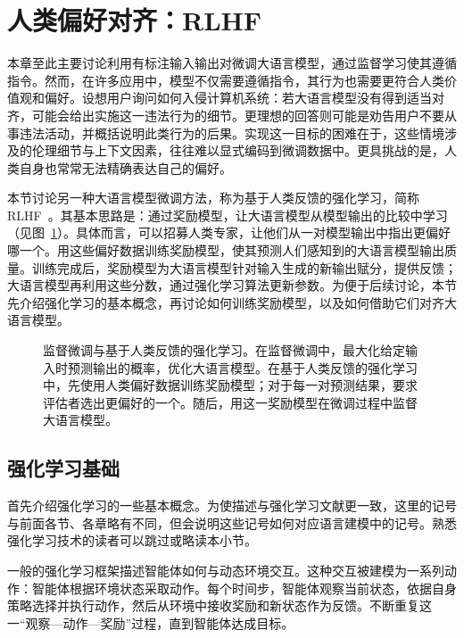 \section{人类偏好对齐：RLHF}
\label{sec:human-preference-alignment}

\noindent 本章至此主要讨论利用有标注输入输出对微调大语言模型，通过监督学习使其遵循指令。然而，在许多应用中，模型不仅需要遵循指令，其行为也需要更符合人类价值观和偏好。设想用户询问如何入侵计算机系统：若大语言模型没有得到适当对齐，可能会给出实施这一违法行为的细节。更理想的回答则可能是劝告用户不要从事违法活动，并概括说明此类行为的后果。实现这一目标的困难在于，这些情境涉及的伦理细节与上下文因素，往往难以显式编码到微调数据中。更具挑战的是，人类自身也常常无法精确表达自己的偏好。

本节讨论另一种大语言模型微调方法，称为基于人类反馈的强化学习，简称 RLHF~\cite{christiano-etal:2017deep,stiennon-etal:2020learning}。其基本思路是：通过奖励模型，让大语言模型从模型输出的比较中学习（见图~\ref{fig:sft-vs-rlhf}）。具体而言，可以招募人类专家，让他们从一对模型输出中指出更偏好哪一个。用这些偏好数据训练奖励模型，使其预测人们感知到的大语言模型输出质量。训练完成后，奖励模型为大语言模型针对输入生成的新输出赋分，提供反馈；大语言模型再利用这些分数，通过强化学习算法更新参数。为便于后续讨论，本节先介绍强化学习的基本概念，再讨论如何训练奖励模型，以及如何借助它们对齐大语言模型。

\begin{figure}[!t]
\centering

\caption{监督微调与基于人类反馈的强化学习。在监督微调中，最大化给定输入时预测输出的概率，优化大语言模型。在基于人类反馈的强化学习中，先使用人类偏好数据训练奖励模型；对于每一对预测结果，要求评估者选出更偏好的一个。随后，用这一奖励模型在微调过程中监督大语言模型。}
\label{fig:sft-vs-rlhf}
\end{figure}

\subsection{强化学习基础}
\label{sec:rl-basics}

\noindent 首先介绍强化学习的一些基本概念。为使描述与强化学习文献更一致，这里的记号与前面各节、各章略有不同，但会说明这些记号如何对应语言建模中的记号。熟悉强化学习技术的读者可以跳过或略读本小节。

一般的强化学习框架描述智能体如何与动态环境交互。这种交互被建模为一系列动作：智能体根据环境状态采取动作。每个时间步，智能体观察当前状态，依据自身策略选择并执行动作，然后从环境中接收奖励和新状态作为反馈。不断重复这一“观察—动作—奖励”过程，直到智能体达成目标。


